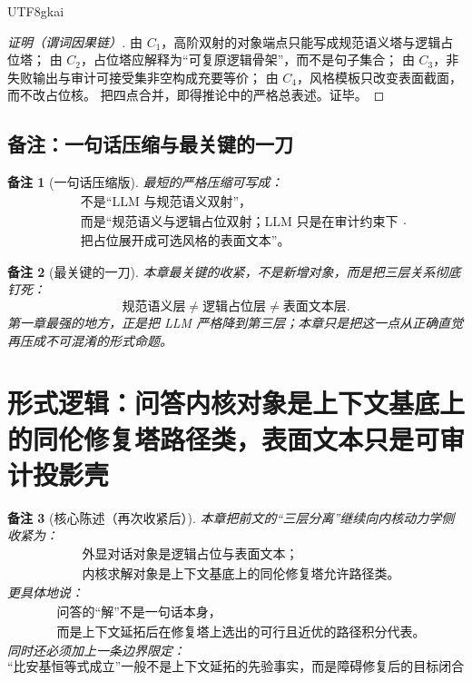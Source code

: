 \documentclass[12pt]{article}
\newtheorem{remark}{备注}[section]
\begin{document}
\begin{CJK*}{UTF8}{gkai}
\begin{proof}[证明（谓词因果链）]
由 $C_1$，高阶双射的对象端点只能写成规范语义塔与逻辑占位塔；
由 $C_2$，占位塔应解释为“可复原逻辑骨架”，而不是句子集合；
由 $C_3$，非失败输出与审计可接受集非空构成充要等价；
由 $C_4$，风格模板只改变表面截面，而不改占位核。
把四点合并，即得推论中的严格总表述。证毕。
\end{proof}

\subsection{备注：一句话压缩与最关键的一刀}
\label{subsec:tex37-ch3-remarks}

\begin{remark}[一句话压缩版]
最短的严格压缩可写成：
\[
  \boxed{
    \begin{aligned}
      &\text{不是“LLM 与规范语义双射”，}\\
      &\text{而是“规范语义与逻辑占位双射；LLM 只是在审计约束下}\\
      &\text{把占位展开成可选风格的表面文本”。}
    \end{aligned}
  }.
\]
\end{remark}

\begin{remark}[最关键的一刀]
本章最关键的收紧，不是新增对象，而是把三层关系彻底钉死：
\[
  \text{规范语义层}
  \neq
  \text{逻辑占位层}
  \neq
  \text{表面文本层}.
\]
第一章最强的地方，正是把 LLM 严格降到第三层；本章只是把这一点从正确直觉再压成不可混淆的形式命题。
\end{remark}

\clearpage

\section{形式逻辑：问答内核对象是上下文基底上的同伦修复塔路径类，表面文本只是可审计投影壳}
\label{sec:tex37-ch4}

\begin{remark}[核心陈述（再次收紧后）]
本章把前文的“三层分离”继续向内核动力学侧收紧为：
\[
  \boxed{
    \begin{aligned}
      &\text{外显对话对象是逻辑占位与表面文本；}\\
      &\text{内核求解对象是上下文基底上的同伦修复塔允许路径类。}
    \end{aligned}
  }
\]
更具体地说：
\[
  \boxed{
    \begin{aligned}
      &\text{问答的“解”不是一句话本身，}\\
      &\text{而是上下文延拓后在修复塔上选出的可行且近优的路径积分代表。}
    \end{aligned}
  }
\]
同时还必须加上一条边界限定：
\[
  \boxed{
    \text{“比安基恒等式成立”一般不是上下文延拓的先验事实，而是障碍修复后的目标闭合态。}
  }
\]
\end{remark}


\end{CJK*}
\end{document}
